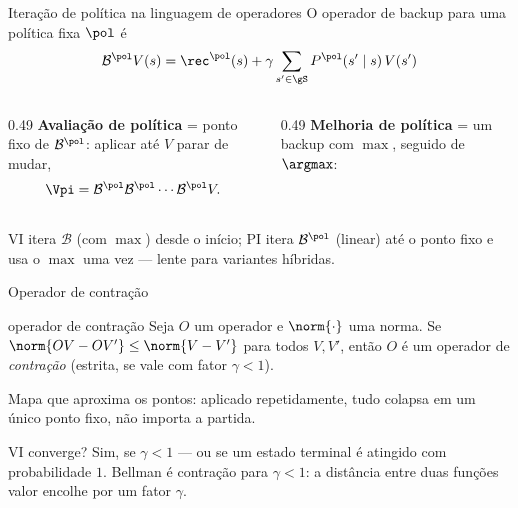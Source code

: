 \documentclass[aspectratio=169, 11pt]{beamer}
\newcommand{\Bop}{\mathcal{B}}                 %
\newcommand{\Bpol}{\mathcal{B}^{\pol}}         %
\begin{document}
\begin{frame}{Iteração de política na linguagem de operadores}
  O operador de backup \alert{para uma política fixa} $\pol$ é
  \[
    \Bpol V(s) = \rec^{\pol}(s) + \gamma \sum_{s' \in \gS} P^{\pol}(s' \mid s)\, V(s')
  \]
  \begin{columns}[T]
    \begin{column}{0.49\textwidth}
      \textbf{Avaliação de política} = \alert{ponto fixo} de $\Bpol$: aplicar até $V$
      parar de mudar,
      \[
        \Vpi = \Bpol \Bpol \cdots \Bpol V.
      \]
    \end{column}
    \begin{column}{0.49\textwidth}
      \textbf{Melhoria de política} = um backup com $\max$, seguido de $\argmax$:
      \vspace{-0.3em}
      \begin{center}
      \end{center}
    \end{column}
  \end{columns}
  \vspace{0.4em}
  \begin{ideiabox}
    VI itera $\Bop$ (com $\max$) desde o início; PI itera $\Bpol$ (linear) até o ponto
    fixo e usa o $\max$ uma vez --- lente para variantes híbridas.
  \end{ideiabox}
\end{frame}

\begin{frame}{Operador de contração}
  \begin{defbox}[fontupper=\small]{operador de contração}
    Seja $O$ um operador e $\norm{\cdot}$ uma norma. Se
    $\norm{OV - OV'} \le \norm{V - V'}$ para todos $V, V'$, então $O$ é um operador de
    \emph{contração} (estrita, se vale com fator $\gamma<1$).
  \end{defbox}
  \begin{ideiabox}
    Mapa que \alert{aproxima os pontos}: aplicado repetidamente, tudo colapsa em um
    único ponto fixo, não importa a partida.
  \end{ideiabox}
  \begin{teobox}{VI converge?}
    Sim, se $\gamma < 1$ --- ou se um estado terminal é atingido com probabilidade $1$.
    Bellman é contração para $\gamma<1$: a distância entre duas funções valor
    \alert{encolhe} por um fator $\gamma$.
  \end{teobox}
\end{frame}
\end{document}
